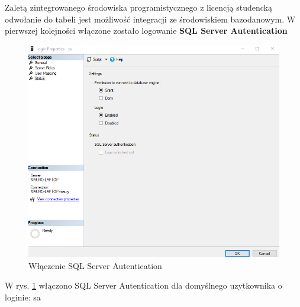 Zaletą zintegrowanego środowiska programistycznego z licencją studencką {odwołanie do tabeli} jest możliwość integracji ze środowiskiem bazodanowym.
W pierwszej kolejności włączone zostało logowanie \textbf{SQL Server Autentication}

\begin{figure}[h]
    \includegraphics[scale=0.7]{rys05/login_prop.png}
    \caption{Włączenie SQL Server Autentication}
    \label{auth_etykieta}
\end{figure}

W rys. \ref{auth_etykieta} włączono SQL Server Autentication dla domyślnego uzytkownika o loginie: sa

\newpage

